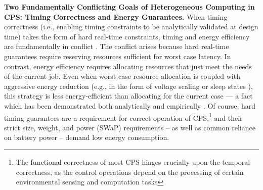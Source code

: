 
\vspace{2mm} \noindent \textbf{Two Fundamentally Conflicting Goals of
Heterogeneous Computing in CPS: Timing Correctness and Energy
Guarantees.} When timing correctness (i.e., enabling timing constraints to be analytically validated at design time) takes the form of hard real-time
constraints, timing and energy efficiency are fundamentally in
conflict \cite{conflict-book}. The conflict arises because hard
real-time guarantees require reserving resources sufficient for worst
case latency.  In contrast, energy efficiency requires allocating
resources that just meet the needs of the current job.  Even when
worst case resource allocation is coupled with aggressive energy
reduction (e.g., in the form of voltage scaling \cite{Dudani2002} or
sleep states \cite{Huang2009}), this strategy is less energy-efficient
than allocating for the current case --- a fact which has been
demonstrated both analytically \cite{Albers2011,Bansal2011,Irani} and
empirically \cite{LeSueur11,HotPower,Imes2014a,PowerSlope}. Of course,
hard timing guarantees are a requirement for correct operation of
CPS,\footnote{The functional correctness of most CPS hinges crucially upon the temporal correctness, as the control operations depend on the processing of certain environmental sensing and computation tasks} and their strict size, weight, and power (SWaP)
requirements -- as well as common reliance on battery power -- demand
low energy consumption.

